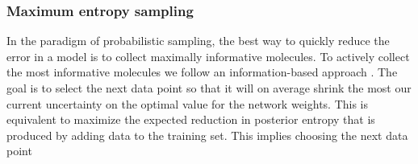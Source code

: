 \subsubsection{Maximum entropy sampling}

In the paradigm of probabilistic sampling, the best way to quickly reduce the error in a model is to collect maximally informative molecules. To actively collect the most informative molecules we follow an information-based approach \cite{MacKay_1992}. The goal
is to select the next data point so that it will on average shrink the most our current uncertainty on the optimal value for the network weights. This is equivalent to maximize the expected reduction in posterior entropy that is produced by adding data to the training set. This implies choosing the next data point 
